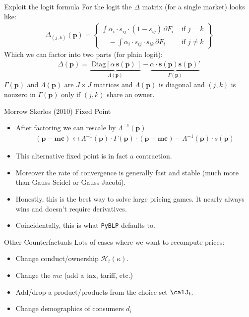 \begin{frame}{Exploit the logit formula}
For the logit the $\Delta$ matrix (for a single market) looks like:
\begin{align*}
\Delta_{(j,k)}(\symbf{p}) = \left\{\begin{array}{lr}
       \int \alpha_i \cdot s_{ij}\cdot (1-s_{ij}) \, \partial F_i& \text{ if } j=k \\
       	  \quad -\int \alpha_i \cdot s_{ij} \cdot s_{ik} \, \partial F_i &  \text{ if }  j\neq k 
        \end{array} \right\}
\end{align*}
Which we can factor into two parts (for plain logit):
\begin{align*}
\Delta(\symbf{p}) =  \underbrace{\text{ Diag}\left[ \alpha \, \symbf{s}(\symbf{p}) \, \right]}_{\Lambda(\symbf{p})} -  \underbrace{\alpha \cdot \symbf{s}(\symbf{p}) \symbf{s}(\symbf{p})'}_{\Gamma(\symbf{p})}
\end{align*}
$\Gamma(\symbf{p})$ and $\Lambda(\symbf{p})$ are $J \times J$ matrices and $\Lambda(\symbf{p})$ is diagonal and $(j,k)$ is nonzero in $\Gamma(\symbf{p})$ only if $(j,k)$ share an owner.
\end{frame}


\begin{frame}{Morrow Skerlos (2010) Fixed Point}
\begin{itemize}
\item After factoring we can rescale by $\Lambda^{-1} (\symbf{p})$
\begin{align*}
(\symbf{p}-\symbf{mc} ) \mapsfrom \Lambda^{-1}(\symbf{p}) \cdot \Gamma(\symbf{p})\cdot(\symbf{p}- \symbf{mc}) - \Lambda^{-1}(\symbf{p})\cdot s(\symbf{p})
\end{align*}
\item This alternative fixed point is in fact a contraction.
\item Moreover the rate of convergence is generally fast and stable (much more than Gauss-Seidel or Gauss-Jacobi).
\item Honestly, this is the best way to solve large pricing games. It nearly always wins and doesn't require derivatives.
\item Coincidentally, this is what \texttt{PyBLP} defaults to.
\end{itemize}
\end{frame}



\begin{frame}{Other Counterfactuals}
Lots of cases where we want to recompute prices:
\begin{itemize}
\item Change conduct/ownership $\mathcal{H}_t(\kappa)$.
\item Change the $mc$ (add a tax, tariff, etc.)
\item Add/drop a product/products from the choice set $\calJ_t$.
\item Change demographics of consumers $d_i$
\end{itemize}
\end{frame}










